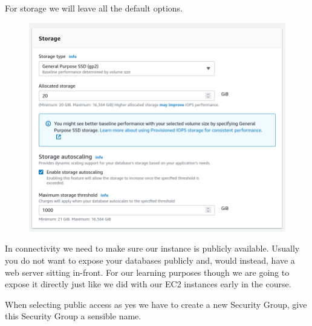 \documentclass{csse4400}
\begin{document}
For storage we will leave all the default options.

\begin{figure}[H]
  \includegraphics[width=\textwidth]{images/db5}
\end{figure}

In connectivity we need to make sure our instance is publicly available. Usually you do not want to expose your databases publicly and, would instead, have a web server sitting in-front. For our learning purposes though we are going to expose it directly just like we did with our EC2 instances early in the course.

When selecting public access as yes we have to create a new Security Group,
give this Security Group a sensible name.
\end{document}
